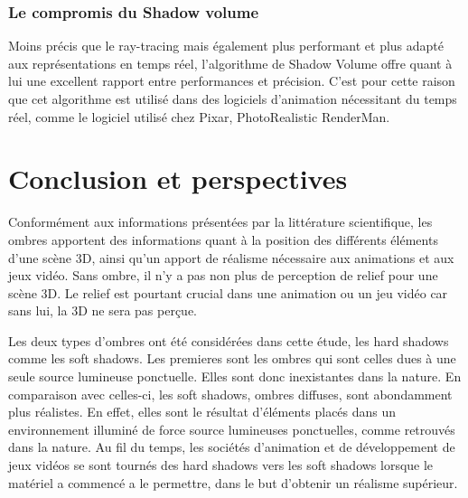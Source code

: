 \documentclass[a4paper,10pt]{report}
\begin{document}
\subsection{Le compromis du Shadow volume}

Moins précis que le ray-tracing mais également plus performant et plus adapté aux représentations en temps réel, l'algorithme de Shadow Volume offre quant à lui une excellent rapport entre performances et précision. C'est pour cette raison que cet algorithme est utilisé dans des logiciels d'animation nécessitant du temps réel, comme le logiciel utilisé chez Pixar, PhotoRealistic RenderMan.


\chapter{Conclusion et perspectives}

Conformément aux informations présentées par la littérature scientifique, les ombres apportent des informations quant à la position des différents éléments d'une scène 3D, ainsi qu'un apport de réalisme nécessaire aux animations et aux jeux vidéo. Sans ombre, il n'y a pas non plus de perception de relief pour une scène 3D. Le relief est pourtant crucial dans une animation ou un jeu vidéo car sans lui, la 3D ne sera pas perçue. 


Les deux types d'ombres ont été considérées dans cette étude, les hard shadows comme les soft shadows. Les premieres sont les ombres qui sont celles dues à une seule source lumineuse ponctuelle. Elles sont donc inexistantes dans la nature. En comparaison avec celles-ci, les soft shadows, ombres diffuses, sont abondamment plus réalistes. En effet, elles sont le résultat d'éléments placés dans un environnement illuminé de force source lumineuses ponctuelles, comme retrouvés dans la nature.
Au fil du temps, les sociétés d'animation et de développement de jeux vidéos se sont tournés des hard shadows vers les soft shadows lorsque le matériel a commencé a le permettre, dans le but d'obtenir un réalisme supérieur.
\end{document}
